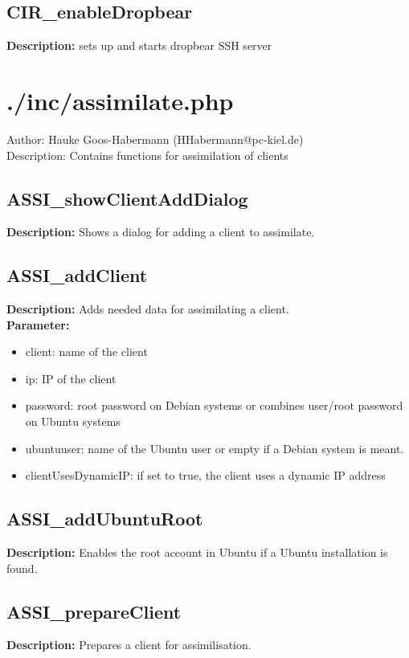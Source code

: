 \subsection{CIR\_enableDropbear}
\textbf{Description:} sets up and starts dropbear SSH server\\

\newpage\section{./inc/assimilate.php}
 Author: Hauke Goos-Habermann (HHabermann@pc-kiel.de)\\
 Description: Contains functions for assimilation of clients\\

\subsection{ASSI\_showClientAddDialog}
\textbf{Description:} Shows a dialog for adding a client to assimilate.\\

\subsection{ASSI\_addClient}
\textbf{Description:} Adds needed data for assimilating a client.\\
\textbf{Parameter:}
\begin{itemize}
\item client: name of the client
\item ip: IP of the client
\item password: root password on Debian systems or combines user/root password on Ubuntu systems
\item ubuntuuser: name of the Ubuntu user or empty if a Debian system is meant.
\item clientUsesDynamicIP: if set to true, the client uses a dynamic IP address
\end{itemize}

\subsection{ASSI\_addUbuntuRoot}
\textbf{Description:} Enables the root account in Ubuntu if a Ubuntu installation is found.\\

\subsection{ASSI\_prepareClient}
\textbf{Description:} Prepares a client for assimilisation.\\


